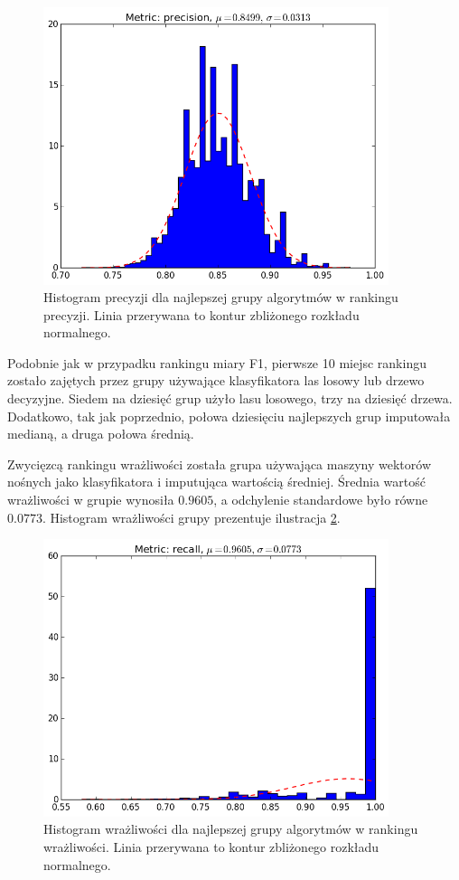 \documentclass[../thesis.tex]{subfiles}
\begin{document}
\begin{figure}[h]
\centering
\includegraphics[width=0.9\textwidth]{13-precision.png}
\caption{Histogram precyzji dla najlepszej grupy algorytmów w rankingu precyzji. Linia przerywana to kontur zbliżonego rozkładu normalnego.}
\label{results:histogram_p_best}
\end{figure}

Podobnie jak w przypadku rankingu miary F1, pierwsze 10 miejsc rankingu zostało zajętych przez grupy używające klasyfikatora las losowy lub drzewo decyzyjne. Siedem na dziesięć grup użyło lasu losowego, trzy na dziesięć drzewa. Dodatkowo, tak jak poprzednio, połowa dziesięciu najlepszych grup imputowała medianą, a druga połowa średnią.

Zwycięzcą rankingu wrażliwości została grupa używająca maszyny wektorów nośnych jako klasyfikatora i imputująca wartością średniej. Średnia wartość wrażliwości w grupie wynosiła $0.9605$, a odchylenie standardowe było równe $0.0773$. Histogram wrażliwości grupy prezentuje ilustracja \ref{results:histogram_r_best}. 

\begin{figure}[h]
\centering
\includegraphics[width=0.9\textwidth]{68-recall.png}
\caption{Histogram wrażliwości dla najlepszej grupy algorytmów w rankingu wrażliwości. Linia przerywana to kontur zbliżonego rozkładu normalnego.}
\label{results:histogram_r_best}
\end{figure}
\end{document}
